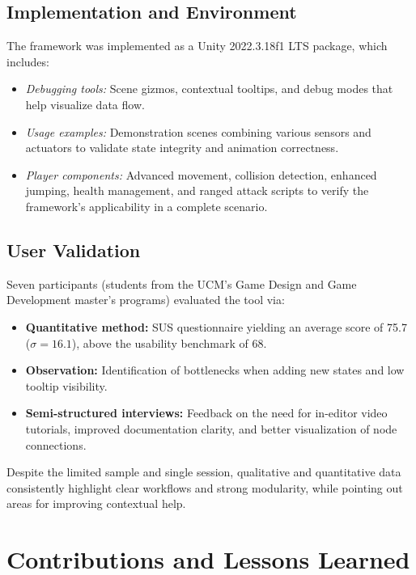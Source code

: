 \subsection{Implementation and Environment}
The framework was implemented as a Unity 2022.3.18f1 LTS package, which includes:
\begin{itemize}
  \item \emph{Debugging tools:} Scene gizmos, contextual tooltips, and debug modes that help visualize data flow.
  \item \emph{Usage examples:} Demonstration scenes combining various sensors and actuators to validate state integrity and animation correctness.
  \item \emph{Player components:} Advanced movement, collision detection, enhanced jumping, health management, and ranged attack scripts to verify the framework’s applicability in a complete scenario.
\end{itemize}

\subsection{User Validation}
Seven participants (students from the UCM’s Game Design and Game Development master’s programs) evaluated the tool via:
\begin{itemize}
  \item \textbf{Quantitative method:} SUS questionnaire yielding an average score of 75.7 (\(\sigma=16.1\)), above the usability benchmark of 68.
  \item \textbf{Observation:} Identification of bottlenecks when adding new states and low tooltip visibility.
  \item \textbf{Semi-structured interviews:} Feedback on the need for in-editor video tutorials, improved documentation clarity, and better visualization of node connections.
\end{itemize}
Despite the limited sample and single session, qualitative and quantitative data consistently highlight clear workflows and strong modularity, while pointing out areas for improving contextual help.

\section{Contributions and Lessons Learned}

